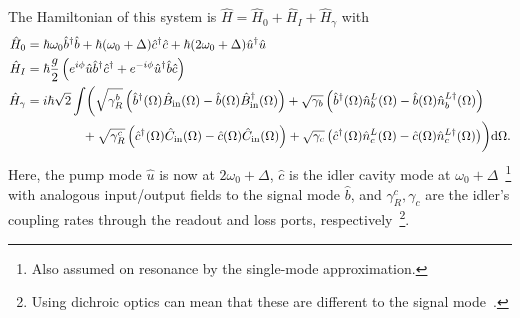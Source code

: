 The Hamiltonian of this system is $\hat H = \hat H_0+\hat H_I+\hat H_\gamma$ with~\cite{}
\begin{align}
\hat H_0 &= \hbar \omega_0 \hat b^\dag \hat b + \hbar (\omega_0+\Delta) \hat c^\dag \hat c + \hbar (2\omega_0+\Delta) \hat u^\dag \hat u\\
\hat H_I &= \hbar \frac{g}{2} \left(e^{i\phi} \hat u \hat b^\dag \hat c^\dag + e^{-i\phi} \hat u^\dag \hat b \hat c \right)\\
\hat H_\gamma &= i\hbar \sqrt{2}\int \biggl( \sqrt{\gamma^b_R}\left(\hat{b}^\dag(\Omega)\hat{B}_\text{in}(\Omega)-\hat{b}(\Omega)\hat{B}_\text{in}^\dag(\Omega)\right) + \sqrt{\gamma_b}\left(\hat{b}^\dag(\Omega)\hat n^L_b(\Omega)-\hat{b}(\Omega)\hat{n}^{L\dag}_b(\Omega)\right) \nonumber \\
& \hspace*{1.55cm} + \sqrt{\gamma^c_R}\left(\hat{c}^\dag(\Omega)\hat C_\text{in}(\Omega)-\hat{c}(\Omega)\hat C_\text{in}(\Omega)\right) + \sqrt{\gamma_c}\left(\hat{c}^\dag(\Omega)\hat n^L_c(\Omega)-\hat{c}(\Omega)\hat{n}^{L\dag}_c(\Omega)\right)\biggr)\text{d}\Omega \nonumber.
\end{align}
Here, the pump mode $\hat u$ is now at $2\omega_0+\Delta$, $\hat c$ is the idler cavity mode at $\omega_0+\Delta$~\footnote{Also assumed on resonance by the single-mode approximation.} with analogous input/output fields to the signal mode $\hat b$,
and $\gamma^c_R,\gamma_c$ are the idler's coupling rates through the readout and loss ports, respectively~\footnote{Using dichroic optics can mean that these are different to the signal mode~\cite{}.}. %
